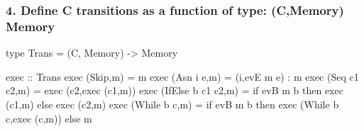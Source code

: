 \documentclass{beamer}
\begin{document}
    
\begin{frame}[fragile]
\frametitle{4. Define C transitions as a function of type: \<(C,Memory) \ra Memory\>}

\begin{smallcode}
type Trans  = (C, Memory) -> Memory

exec :: Trans
exec (Skip,m)           = m
exec (Asn i e,m)        = (i,evE m e) : m
exec (Seq c1 c2,m)      = exec (c2,exec (c1,m))
exec (IfElse b c1 c2,m) = if evB m b 
                            then exec (c1,m) 
                            else exec (c2,m)
exec (While b c,m)      = if evB m b 
                            then exec (While b c,exec (c,m))
                            else m
\end{smallcode}

\end{frame}
\end{document}
